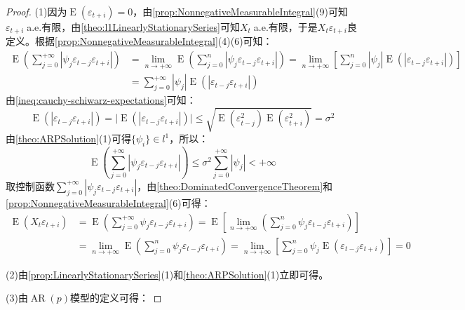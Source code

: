 \begin{proof}
	(1)因为$\operatorname{E}(\varepsilon_{t+i})=0$，由\cref{prop:NonnegativeMeasurableIntegral}(9)可知$\varepsilon_{t+i}\;$a.e.有限，由\cref{theo:l1LinearlyStationarySeries}可知$X_t\;$a.e.有限，于是$X_t\varepsilon_{t+i}$良定义。根据\cref{prop:NonnegativeMeasurableIntegral}(4)(6)可知：
	\begin{align*}
		\operatorname{E}\left(\sum_{j=0}^{+\infty}|\psi_j\varepsilon_{t-j}\varepsilon_{t+i}|\right)
		&=\lim_{n\to+\infty}\operatorname{E}\left(\sum_{j=0}^{n}|\psi_j\varepsilon_{t-j}\varepsilon_{t+i}|\right)
		=\lim_{n\to+\infty}\left[\sum_{j=0}^{n}|\psi_j|\operatorname{E}(|\varepsilon_{t-j}\varepsilon_{t+i}|)\right] \\
		&=\sum_{j=0}^{+\infty}|\psi_j|\operatorname{E}(|\varepsilon_{t-j}\varepsilon_{t+i}|)
	\end{align*}
	由\cref{ineq:cauchy-schiwarz-expectations}可知：
	\begin{equation*}
		\operatorname{E}(|\varepsilon_{t-j}\varepsilon_{t+i}|)=\Big|\operatorname{E}(|\varepsilon_{t-j}\varepsilon_{t+i}|)\Big|\leqslant\sqrt{\operatorname{E}(\varepsilon_{t-j}^2)\operatorname{E}(\varepsilon_{t+i}^2)}=\sigma^2
	\end{equation*}
	由\cref{theo:ARPSolution}(1)可得$\{\psi_i\}\in l^1$，所以：
	\begin{equation*}
		\operatorname{E}\left(\sum_{j=0}^{+\infty}|\psi_j\varepsilon_{t-j}\varepsilon_{t+i}|\right)\leqslant\sigma^2\sum_{j=0}^{+\infty}|\psi_j|<+\infty
	\end{equation*}
	取控制函数$\sum\limits_{j=0}^{+\infty}|\psi_j\varepsilon_{t-j}\varepsilon_{t+i}|$，由\cref{theo:DominatedConvergenceTheorem}和\cref{prop:NonnegativeMeasurableIntegral}(6)可得：
	\begin{align*}
		\operatorname{E}(X_t\varepsilon_{t+i})&=\operatorname{E}\left(\sum_{j=0}^{+\infty}\psi_j\varepsilon_{t-j}\varepsilon_{t+i}\right)=\operatorname{E}\left[\lim_{n\to+\infty}\left(\sum_{j=0}^{n}\psi_j\varepsilon_{t-j}\varepsilon_{t+i}\right)\right] \\
		&=\lim_{n\to+\infty}\operatorname{E}\left(\sum_{j=0}^{n}\psi_j\varepsilon_{t-j}\varepsilon_{t+i}\right)=\lim_{n\to+\infty}\left[\sum_{j=0}^{n}\psi_j\operatorname{E}(\varepsilon_{t-j}\varepsilon_{t+i})\right]=0
	\end{align*}\par
	(2)由\cref{prop:LinearlyStationarySeries}(1)和\cref{theo:ARPSolution}(1)立即可得。\par
	(3)由$\operatorname{AR}(p)$模型的定义可得：

\end{proof}
